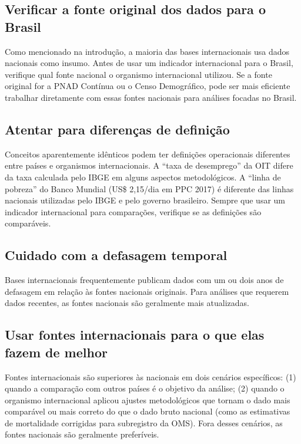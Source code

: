 \subsection{Verificar a fonte original dos dados para o Brasil}

Como mencionado na introdução, a maioria das bases internacionais usa dados nacionais como insumo. Antes de usar um indicador internacional para o Brasil, verifique qual fonte nacional o organismo internacional utilizou. Se a fonte original for a PNAD Contínua ou o Censo Demográfico, pode ser mais eficiente trabalhar diretamente com essas fontes nacionais para análises focadas no Brasil.

\subsection{Atentar para diferenças de definição}

Conceitos aparentemente idênticos podem ter definições operacionais diferentes entre países e organismos internacionais. A ``taxa de desemprego'' da OIT difere da taxa calculada pelo IBGE em alguns aspectos metodológicos. A ``linha de pobreza'' do Banco Mundial (US\$ 2,15/dia em PPC 2017) é diferente das linhas nacionais utilizadas pelo IBGE e pelo governo brasileiro. Sempre que usar um indicador internacional para comparações, verifique se as definições são comparáveis.

\subsection{Cuidado com a defasagem temporal}

Bases internacionais frequentemente publicam dados com um ou dois anos de defasagem em relação às fontes nacionais originais. Para análises que requerem dados recentes, as fontes nacionais são geralmente mais atualizadas.

\subsection{Usar fontes internacionais para o que elas fazem de melhor}

Fontes internacionais são superiores às nacionais em dois cenários específicos: (1) quando a comparação com outros países é o objetivo da análise; (2) quando o organismo internacional aplicou ajustes metodológicos que tornam o dado mais comparável ou mais correto do que o dado bruto nacional (como as estimativas de mortalidade corrigidas para subregistro da OMS). Fora desses cenários, as fontes nacionais são geralmente preferíveis.

